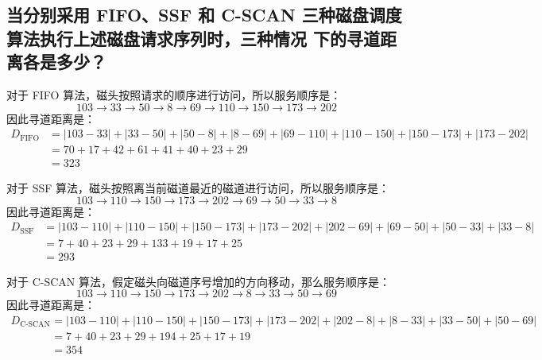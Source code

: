 
\begin{parts}
    \part {
        当分别采用 FIFO、SSF 和 C-SCAN 三种磁盘调度算法执行上述磁盘请求序列时，三种情况
        下的寻道距离各是多少？
    }
\end{parts}

\begin{solution}

对于 FIFO 算法，磁头按照请求的顺序进行访问，所以服务顺序是：
$$
    103 \rightarrow 33 \rightarrow 50 \rightarrow 8 \rightarrow 69
    \rightarrow 110 \rightarrow 150 \rightarrow 173 \rightarrow 202
$$
因此寻道距离是：
$$
\begin{aligned}
    D_{\text{FIFO}} &= |103 - 33| + |33 - 50| + |50 - 8| + |8 - 69| + |69 - 110|
                       + |110 - 150| + |150 - 173| + |173 - 202| \\
                    &= 70 + 17 + 42 + 61 + 41 + 40 + 23 + 29 \\
                    &= 323
\end{aligned}
$$

对于 SSF 算法，磁头按照离当前磁道最近的磁道进行访问，所以服务顺序是：
$$
    103 \rightarrow 110 \rightarrow 150 \rightarrow 173 \rightarrow 202
    \rightarrow 69 \rightarrow 50 \rightarrow 33 \rightarrow 8
$$
因此寻道距离是：
$$
\begin{aligned}
    D_{\text{SSF}} &= |103 - 110| + |110 - 150| + |150 - 173| + |173 - 202|
                     + |202 - 69| + |69 - 50| + |50 - 33| + |33 - 8| \\
                  &= 7 + 40 + 23 + 29 + 133 + 19 + 17 + 25 \\
                  &= 293
\end{aligned}
$$

对于 C-SCAN 算法，假定磁头向磁道序号增加的方向移动，那么服务顺序是：
$$
    103 \rightarrow 110 \rightarrow 150 \rightarrow 173 \rightarrow 202
    \rightarrow 8 \rightarrow 33 \rightarrow 50 \rightarrow 69
$$
因此寻道距离是：
$$
\begin{aligned}
    D_{\text{C-SCAN}} &= |103 - 110| + |110 - 150| + |150 - 173| + |173 - 202|
                        + |202 - 8| + |8 - 33| + |33 - 50| + |50 - 69| \\
                     &= 7 + 40 + 23 + 29 + 194 + 25 + 17 + 19 \\
                     &= 354
\end{aligned}
$$

\end{solution}
